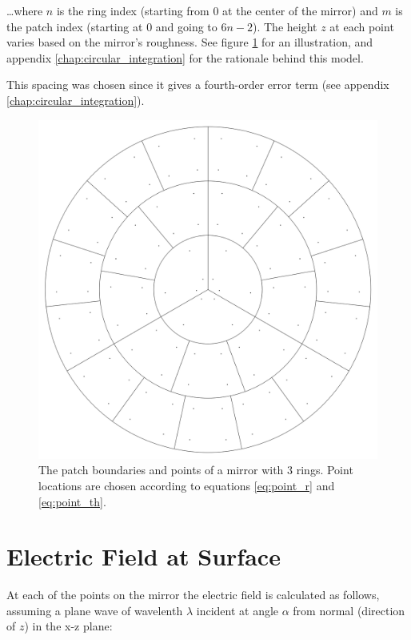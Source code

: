 \documentclass[etd,senior,noacknowledgments]{BYUPhys}
\begin{document}
\ldots where $n$ is the ring index (starting from 0 at the center of the mirror) and $m$ is the patch index (starting at 0 and going to $6n-2$). The height $z$ at each point varies based on the mirror's roughness. See figure \ref{fig:patches_points} for an illustration, and appendix \ref{chap:circular_integration} for the rationale behind this model.

This spacing was chosen since it gives a fourth-order error term (see appendix \ref{chap:circular_integration}).

\begin{figure}
  \centerline{\includegraphics[width=\textwidth]{circular-grid-with-points}}
  \caption[Mirror patch boundaries and point locations]{\label{fig:patches_points}
    The patch boundaries and points of a mirror with 3 rings. Point locations are chosen according to equations \ref{eq:point_r} and \ref{eq:point_th}.}
\end{figure}



\section{Electric Field at Surface}\label{sec:efield}

At each of the points on the mirror the electric field is calculated as follows, assuming a plane wave of wavelenth $\lambda$ incident at angle $\alpha$ from normal (direction of $z$) in the x-z plane:
\end{document}
